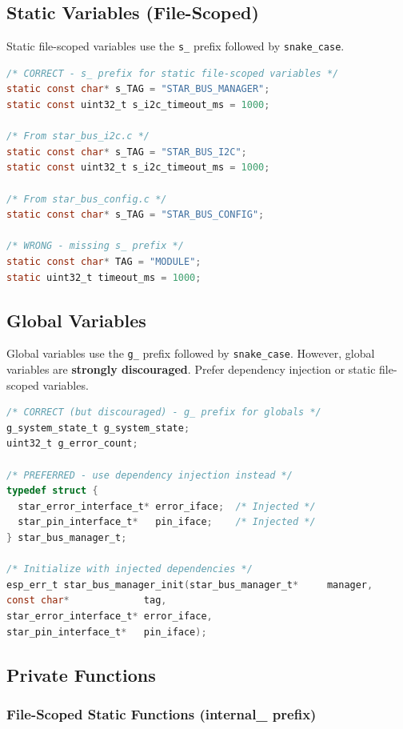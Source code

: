 \subsection{Static Variables (File-Scoped)}

Static file-scoped variables use the \texttt{s\_} prefix followed by \texttt{snake\_case}.

\begin{lstlisting}[language=C]
/* CORRECT - s_ prefix for static file-scoped variables */
static const char* s_TAG = "STAR_BUS_MANAGER";
static const uint32_t s_i2c_timeout_ms = 1000;

/* From star_bus_i2c.c */
static const char* s_TAG = "STAR_BUS_I2C";
static const uint32_t s_i2c_timeout_ms = 1000;

/* From star_bus_config.c */
static const char* s_TAG = "STAR_BUS_CONFIG";

/* WRONG - missing s_ prefix */
static const char* TAG = "MODULE";
static uint32_t timeout_ms = 1000;
\end{lstlisting}

\subsection{Global Variables}

Global variables use the \texttt{g\_} prefix followed by \texttt{snake\_case}. However, global variables are \textbf{strongly discouraged}. Prefer dependency injection or static file-scoped variables.

\begin{lstlisting}[language=C]
/* CORRECT (but discouraged) - g_ prefix for globals */
g_system_state_t g_system_state;
uint32_t g_error_count;

/* PREFERRED - use dependency injection instead */
typedef struct {
  star_error_interface_t* error_iface;  /* Injected */
  star_pin_interface_t*   pin_iface;    /* Injected */
} star_bus_manager_t;

/* Initialize with injected dependencies */
esp_err_t star_bus_manager_init(star_bus_manager_t*     manager,
const char*             tag,
star_error_interface_t* error_iface,
star_pin_interface_t*   pin_iface);
\end{lstlisting}

\subsection{Private Functions}

\subsubsection{File-Scoped Static Functions (internal\_ prefix)}

